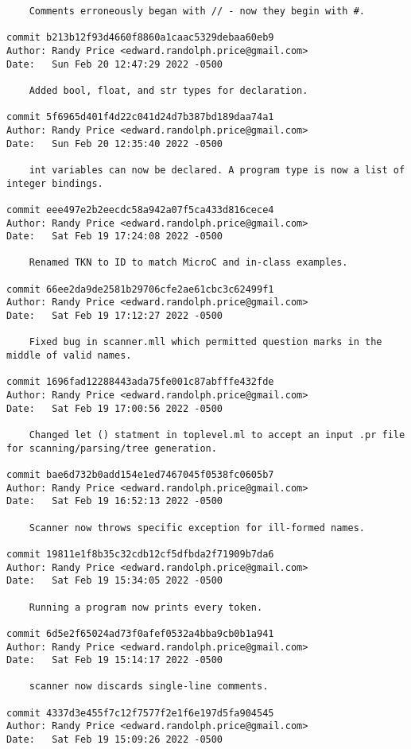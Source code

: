 {\begin{verbatim}
    Comments erroneously began with // - now they begin with #.

commit b213b12f93d4660f8860a1caac5329debaa60eb9
Author: Randy Price <edward.randolph.price@gmail.com>
Date:   Sun Feb 20 12:47:29 2022 -0500

    Added bool, float, and str types for declaration.

commit 5f6965d401f4d22c041d24d7b387bd189daa74a1
Author: Randy Price <edward.randolph.price@gmail.com>
Date:   Sun Feb 20 12:35:40 2022 -0500

    int variables can now be declared. A program type is now a list of integer bindings.

commit eee497e2b2eecdc58a942a07f5ca433d816cece4
Author: Randy Price <edward.randolph.price@gmail.com>
Date:   Sat Feb 19 17:24:08 2022 -0500

    Renamed TKN to ID to match MicroC and in-class examples.

commit 66ee2da9de2581b29706cfe2ae61cbc3c62499f1
Author: Randy Price <edward.randolph.price@gmail.com>
Date:   Sat Feb 19 17:12:27 2022 -0500

    Fixed bug in scanner.mll which permitted question marks in the middle of valid names.

commit 1696fad12288443ada75fe001c87abfffe432fde
Author: Randy Price <edward.randolph.price@gmail.com>
Date:   Sat Feb 19 17:00:56 2022 -0500

    Changed let () statment in toplevel.ml to accept an input .pr file for scanning/parsing/tree generation.

commit bae6d732b0add154e1ed7467045f0538fc0605b7
Author: Randy Price <edward.randolph.price@gmail.com>
Date:   Sat Feb 19 16:52:13 2022 -0500

    Scanner now throws specific exception for ill-formed names.

commit 19811e1f8b35c32cdb12cf5dfbda2f71909b7da6
Author: Randy Price <edward.randolph.price@gmail.com>
Date:   Sat Feb 19 15:34:05 2022 -0500

    Running a program now prints every token.

commit 6d5e2f65024ad73f0afef0532a4bba9cb0b1a941
Author: Randy Price <edward.randolph.price@gmail.com>
Date:   Sat Feb 19 15:14:17 2022 -0500

    scanner now discards single-line comments.

commit 4337d3e455f7c12f7577f2e1f6e197d5fa904545
Author: Randy Price <edward.randolph.price@gmail.com>
Date:   Sat Feb 19 15:09:26 2022 -0500


\end{verbatim}}

